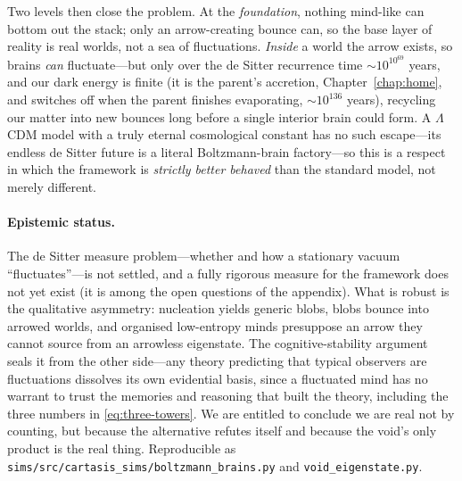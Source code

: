 Two levels then close the problem. At the \emph{foundation}, nothing mind-like can
bottom out the stack; only an arrow-creating bounce can, so the base layer of
reality is real worlds, not a sea of fluctuations. \emph{Inside} a world the arrow
exists, so brains \emph{can} fluctuate---but only over the de Sitter recurrence
time $\sim10^{10^{69}}$ years, and our dark energy is finite (it is the parent's
accretion, Chapter~\ref{chap:home}, and switches off when the parent finishes
evaporating, $\sim10^{136}$ years), recycling our matter into new bounces long
before a single interior brain could form. A $\Lambda$CDM model with a truly
eternal cosmological constant has no such escape---its endless de Sitter future is
a literal Boltzmann-brain factory---so this is a respect in which the framework is
\emph{strictly better behaved} than the standard model, not merely different.

\paragraph{Epistemic status.} The de Sitter measure problem---whether and how a
stationary vacuum ``fluctuates''---is not settled, and a fully rigorous measure
for the framework does not yet exist (it is among the open questions of the
appendix). What is robust is the qualitative asymmetry: nucleation yields generic
blobs, blobs bounce into arrowed worlds, and organised low-entropy minds
presuppose an arrow they cannot source from an arrowless eigenstate. The
cognitive-stability argument seals it from the other side---any theory predicting
that typical observers are fluctuations dissolves its own evidential basis, since a
fluctuated mind has no warrant to trust the memories and reasoning that built the
theory, including the three numbers in \eqref{eq:three-towers}. We are entitled to
conclude we are real not by counting, but because the alternative refutes itself
and because the void's only product is the real thing. Reproducible as
\texttt{sims/src/cartasis\_sims/boltzmann\_brains.py} and
\texttt{void\_eigenstate.py}.
